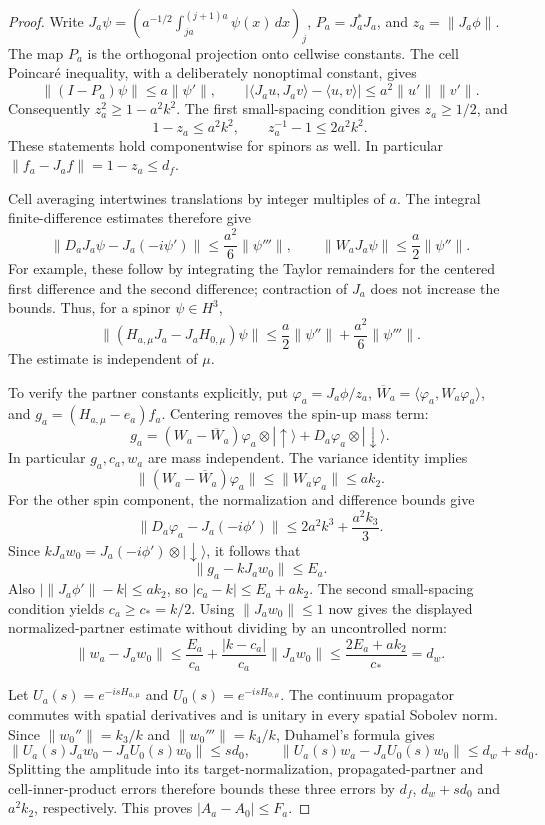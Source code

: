 \documentclass[11pt]{article}
\theoremstyle{definition}
\begin{document}
\begin{proof}
Write $J_a\psi=(a^{-1/2}\int_{ja}^{(j+1)a}\psi(x)\,dx)_j$,
$P_a=J_a^*J_a$, and $z_a=\|J_a\phi\|$.
The map $P_a$ is the orthogonal projection onto cellwise constants.
The cell Poincar\'e inequality, with a deliberately nonoptimal constant,
gives
\[
 \|(I-P_a)\psi\|\le a\|\psi'\|,\qquad
 |\langle J_au,J_av\rangle-\langle u,v\rangle|
 \le a^2\|u'\|\|v'\|.
\]
Consequently $z_a^2\ge1-a^2k^2$. The first small-spacing condition
gives $z_a\ge1/2$, and
\[
 1-z_a\le a^2k^2,\qquad z_a^{-1}-1\le2a^2k^2.
\]
These statements hold componentwise for spinors as well. In particular
$\|f_a-J_af\|=1-z_a\le d_f$.

Cell averaging intertwines translations by integer multiples of $a$.
The integral finite-difference estimates therefore give
\[
 \|D_aJ_a\psi-J_a(-i\psi')\|\le\frac{a^2}{6}\|\psi'''\|,
 \qquad \|W_aJ_a\psi\|\le\frac a2\|\psi''\|.
\]
For example, these follow by integrating the Taylor remainders for
the centered first difference and the second difference; contraction
of $J_a$ does not increase the bounds. Thus, for a spinor
$\psi\in H^3$,
\[
 \|(H_{a,\mu}J_a-J_aH_{0,\mu})\psi\|
 \le\frac a2\|\psi''\|+\frac{a^2}{6}\|\psi'''\|.
\]
The estimate is independent of $\mu$.

To verify the partner constants explicitly, put
$\varphi_a=J_a\phi/z_a$, $\overline W_a=\langle\varphi_a,W_a\varphi_a\rangle$,
and $g_a=(H_{a,\mu}-e_a)f_a$. Centering removes the spin-up mass term:
\[
 g_a=(W_a-\overline W_a)\varphi_a\otimes|\uparrow\rangle
       +D_a\varphi_a\otimes|\downarrow\rangle.
\]
In particular $g_a,c_a,w_a$ are mass independent. The variance identity
implies
\[
 \|(W_a-\overline W_a)\varphi_a\|\le\|W_a\varphi_a\|
 \le ak_2.
\]
For the other spin component, the normalization and difference bounds give
\[
 \|D_a\varphi_a-J_a(-i\phi')\|
 \le 2a^2k^3+\frac{a^2k_3}{3}.
\]
Since $kJ_aw_0=J_a(-i\phi')\otimes|\downarrow\rangle$, it follows that
\[
 \|g_a-kJ_aw_0\|\le E_a.
\]
Also $|\|J_a\phi'\|-k|\le a k_2$, so
$|c_a-k|\le E_a+a k_2$. The second small-spacing condition yields
$c_a\ge c_*=k/2$. Using $\|J_aw_0\|\le1$ now gives the displayed
normalized-partner estimate without dividing by an uncontrolled norm:
\[
 \|w_a-J_aw_0\|
 \le \frac{E_a}{c_a}+\frac{|k-c_a|}{c_a}\|J_aw_0\|
 \le\frac{2E_a+a k_2}{c_*}=d_w.
\]

Let $U_a(s)=e^{-isH_{a,\mu}}$ and $U_0(s)=e^{-isH_{0,\mu}}$.
The continuum propagator commutes with spatial derivatives and is
unitary in every spatial Sobolev norm. Since
$\|w_0''\|=k_3/k$ and $\|w_0'''\|=k_4/k$,
Duhamel's formula gives
\[
 \|U_a(s)J_aw_0-J_aU_0(s)w_0\|\le s d_0,
 \qquad
 \|U_a(s)w_a-J_aU_0(s)w_0\|\le d_w+s d_0.
\]
Splitting the amplitude into its target-normalization, propagated-partner
and cell-inner-product errors therefore bounds these three errors by
$d_f$, $d_w+s d_0$ and $a^2 k_2$, respectively. This proves
$|A_a-A_0|\le F_a$.


\end{proof}
\end{document}

